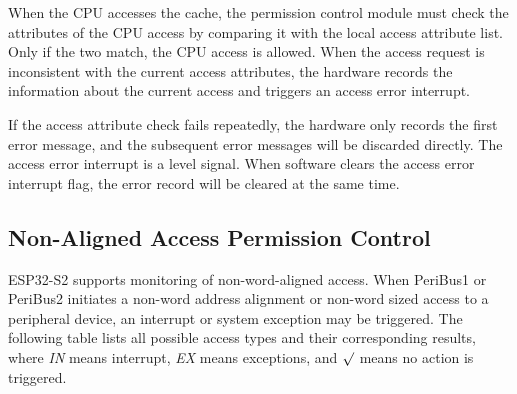 \documentclass[main\_\_EN.tex]{subfiles}
\begin{document}
When the CPU accesses the cache, the permission control module must check the attributes of the CPU access by comparing it with the local access attribute list. Only if the two match, the CPU access is allowed. When the access request is inconsistent with the current access attributes, the hardware records the information about the current access and triggers an access error interrupt.

If the access attribute check fails repeatedly, the hardware only records the first error message, and the subsequent error messages will be discarded directly. The access error interrupt is a level signal. When software clears the access error interrupt flag, the error record will be cleared at the same time.


\subsection{Non-Aligned Access Permission Control}
ESP32-S2 supports monitoring of non-word-aligned access. When PeriBus1 or PeriBus2 initiates a non-word address alignment or non-word sized access to a peripheral device, an interrupt or system exception may be triggered. The following table lists all possible access types and their corresponding results, where \textit{IN} means interrupt, \textit{EX} means exceptions, and \textit{$\surd$} means no action is triggered.
\newpage
\end{document}
